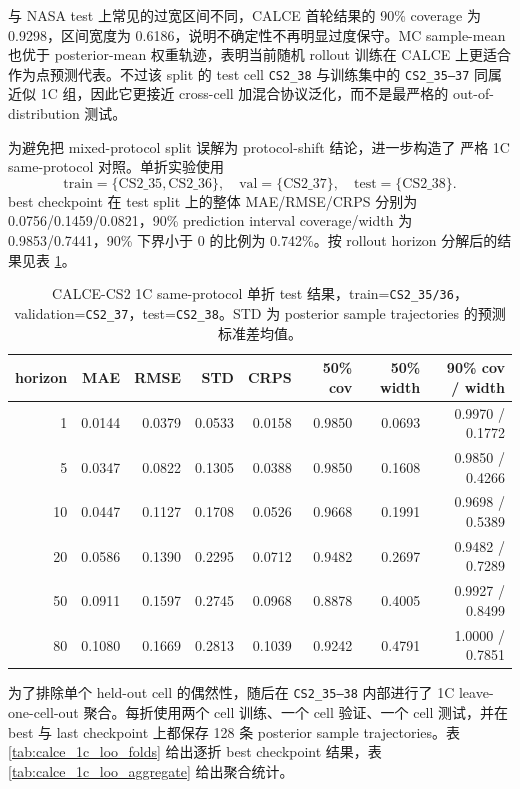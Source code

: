 \documentclass[11pt,a4paper,fontset=none]{ctexart}
\begin{document}
与 NASA test 上常见的过宽区间不同，CALCE 首轮结果的 90\% coverage 为 0.9298，区间宽度为 0.6186，说明不确定性不再明显过度保守。MC sample-mean 也优于 posterior-mean 权重轨迹，表明当前随机 rollout 训练在 CALCE 上更适合作为点预测代表。不过该 split 的 test cell \texttt{CS2\_38} 与训练集中的 \texttt{CS2\_35--37} 同属近似 1C 组，因此它更接近 cross-cell 加混合协议泛化，而不是最严格的 out-of-distribution 测试。

为避免把 mixed-protocol split 误解为 protocol-shift 结论，进一步构造了
严格 1C same-protocol 对照。单折实验使用
\[
\mathrm{train}=\{\mathrm{CS2\_35,CS2\_36}\},\quad
\mathrm{val}=\{\mathrm{CS2\_37}\},\quad
\mathrm{test}=\{\mathrm{CS2\_38}\}.
\]
best checkpoint 在 test split 上的整体 MAE/RMSE/CRPS 分别为
0.0756/0.1459/0.0821，90\% prediction interval coverage/width 为
0.9853/0.7441，90\% 下界小于 0 的比例为 0.742\%。按 rollout horizon
分解后的结果见表 \ref{tab:calce_1c_horizon}。

\begin{table}[h]
\centering
\small
\begin{tabular}{rrrrrrrr}
\toprule
horizon & MAE & RMSE & STD & CRPS & 50\% cov & 50\% width & 90\% cov / width \\
\midrule
1  & 0.0144 & 0.0379 & 0.0533 & 0.0158 & 0.9850 & 0.0693 & 0.9970 / 0.1772 \\
5  & 0.0347 & 0.0822 & 0.1305 & 0.0388 & 0.9850 & 0.1608 & 0.9850 / 0.4266 \\
10 & 0.0447 & 0.1127 & 0.1708 & 0.0526 & 0.9668 & 0.1991 & 0.9698 / 0.5389 \\
20 & 0.0586 & 0.1390 & 0.2295 & 0.0712 & 0.9482 & 0.2697 & 0.9482 / 0.7289 \\
50 & 0.0911 & 0.1597 & 0.2745 & 0.0968 & 0.8878 & 0.4005 & 0.9927 / 0.8499 \\
80 & 0.1080 & 0.1669 & 0.2813 & 0.1039 & 0.9242 & 0.4791 & 1.0000 / 0.7851 \\
\bottomrule
\end{tabular}
\caption{CALCE-CS2 1C same-protocol 单折 test 结果，train=\texttt{CS2\_35/36}，
validation=\texttt{CS2\_37}，test=\texttt{CS2\_38}。STD 为 posterior
sample trajectories 的预测标准差均值。}
\label{tab:calce_1c_horizon}
\end{table}

为了排除单个 held-out cell 的偶然性，随后在 \texttt{CS2\_35--38}
内部进行了 1C leave-one-cell-out 聚合。每折使用两个 cell 训练、一个 cell
验证、一个 cell 测试，并在 best 与 last checkpoint 上都保存 128 条
posterior sample trajectories。表 \ref{tab:calce_1c_loo_folds} 给出逐折
best checkpoint 结果，表 \ref{tab:calce_1c_loo_aggregate} 给出聚合统计。
\end{document}
